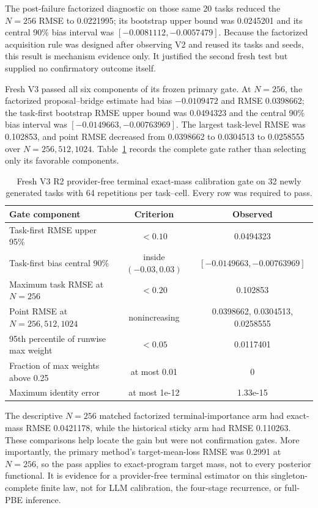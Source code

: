 \documentclass[twoside,11pt]{article}
\begin{document}
The post-failure factorized diagnostic on those same 20 tasks reduced the
$N=256$ RMSE to 0.0221995; its bootstrap upper bound was 0.0245201 and its
central 90\% bias interval was $[-0.0081112,-0.0057479]$. Because the factorized
acquisition rule was designed after observing V2 and reused its tasks and
seeds, this result is mechanism evidence only. It justified the second fresh
test but supplied no confirmatory outcome itself.

Fresh V3 passed all six components of its frozen primary gate. At $N=256$, the
factorized proposal--bridge estimate had bias $-0.0109472$ and RMSE 0.0398662;
the task-first bootstrap RMSE upper bound was 0.0494323 and the central 90\%
bias interval was $[-0.0149663,-0.00763969]$. The largest task-level RMSE was
0.102853, and point RMSE decreased from 0.0398662 to 0.0304513 to 0.0258555
over $N=256,512,1024$. Table~\ref{tab:v3-calibration-gate} records the complete
gate rather than selecting only its favorable components.

\begin{table}[!htbp]
\centering
\small
\caption{Fresh V3 R2 provider-free terminal exact-mass calibration gate on
32 newly generated tasks with 64 repetitions per task--cell. Every row was
required to pass.}
\label{tab:v3-calibration-gate}
\begin{tabular}{@{}lcc@{}}
\toprule
Gate component & Criterion & Observed \\
\midrule
Task-first RMSE upper 95\% & $<0.10$ & 0.0494323 \\
Task-first bias central 90\% & inside $(-0.03,0.03)$ & $[-0.0149663,-0.00763969]$ \\
Maximum task RMSE at $N=256$ & $<0.20$ & 0.102853 \\
Point RMSE at $N=256,512,1024$ & nonincreasing & 0.0398662, 0.0304513, 0.0258555 \\
95th percentile of runwise max weight & $<0.05$ & 0.0117401 \\
Fraction of max weights above 0.25 & at most 0.01 & 0 \\
Maximum identity error & at most 1e-12 & 1.33e-15 \\
\bottomrule
\end{tabular}
\end{table}
\FloatBarrier

The descriptive $N=256$ matched factorized terminal-importance arm had
exact-mass RMSE 0.0421178, while the historical sticky arm had RMSE 0.110263.
These comparisons help locate the gain but were not confirmation gates. More
importantly, the primary method's target-mean-loss RMSE was 0.2991 at $N=256$,
so the pass applies to exact-program target mass, not to every posterior
functional. It is evidence for a provider-free terminal estimator on this
singleton-complete finite law, not for LLM calibration, the four-stage
recurrence, or full-PBE inference.
\end{document}
